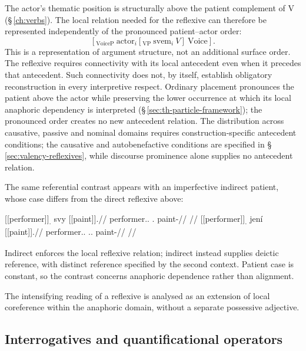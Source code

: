 The actor's thematic position is structurally above the patient complement
of V (§\,\ref{ch:verbs}). The local relation needed for the reflexive can
therefore be represented independently of the pronounced patient--actor order:
\[
 [_{\mathrm{VoiceP}}\ \mathrm{actor}_{i}
   [_{\mathrm{VP}}\ \mathrm{svem}_{i}\ V]\ \mathrm{Voice}].
\]
This is a representation of argument structure, not an additional surface
order. The reflexive requires connectivity with its local antecedent even
when it precedes that antecedent. Such connectivity does not, by itself,
establish obligatory reconstruction in every interpretive respect. Ordinary
placement pronounces the patient above the actor while preserving the lower
occurrence at which its local anaphoric dependency is interpreted
(§\,\ref{sec:th-particle-framework}); the pronounced order creates no new
antecedent relation. The distribution
across causative, passive and nominal domains requires construction-specific
antecedent conditions; the causative and autobenefactive conditions are
specified in §\,\ref{sec:valency-reflexives}, while discourse prominence
alone supplies no antecedent relation.

The same referential contrast appears with an imperfective indirect
patient, whose case differs from the direct reflexive above:

\pex\label{ex:nm-slot-reflexive-patient}
\a
\begingl
\gla \textnormal{[[performer]]}\textsubscript{\Dir{}.\Sg{}} svy \textnormal{[[paint]]}\textsubscript{\Prog{}}.//
\glb performer.\Dir{}.\Sg{} \Refl{}.\Ind{} paint-\Prog{}//
\glft {} //
\endgl
\a
\begingl
\gla \textnormal{[[performer]]}\textsubscript{\Dir{}.\Sg{}} jení \textnormal{[[paint]]}\textsubscript{\Prog{}}.//
\glb performer.\Dir{}.\Sg{} \Dem{}.\Dist{}.\Ind{} paint-\Prog{}//
\glft {} //
\endgl
\xe

Indirect  enforces the local reflexive relation; indirect
 instead supplies deictic reference, with distinct reference
specified by the second context. Patient case is constant, so the contrast
concerns anaphoric dependence rather than alignment.

The intensifying  reading of a reflexive is analysed as an extension
of local coreference within the anaphoric domain, without a separate possessive
adjective.

\subsection{Interrogatives and quantificational operators}
\label{sec:nm-pron-operators}

